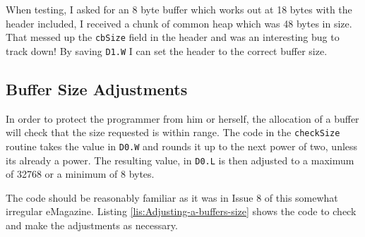 When testing, I asked for an 8 byte buffer which works out at 18 bytes
with the header included, I received a chunk of common heap which
was 48 bytes in size. That messed up the \texttt{cbSize} field in
the header and was an interesting bug to track down! By saving \texttt{D1.W}
I can set the header to the correct buffer size.

\subsection{Buffer Size Adjustments}

In order to protect the programmer from him or herself, the allocation
of a buffer will check that the size requested is within range. The
code in the \texttt{checkSize} routine takes the value in \texttt{D0.W}
and rounds it up to the next power of two, unless its already a power.
The resulting value, in \texttt{D0.L} is then adjusted to a maximum
of 32768 or a minimum of 8 bytes.

The code should be reasonably familiar as it was in Issue 8 of this
somewhat irregular eMagazine. Listing \ref{lis:Adjusting-a-buffers-size}
shows the code to check and make the adjustments as necessary.

